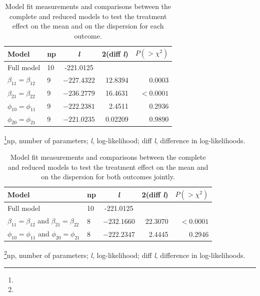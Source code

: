 \documentclass[useAMS,referee]{biom}
\begin{document}

\begin{table}[htb]
\centering
\caption{Model fit measurements and comparisons between the complete and reduced models to test the treatment effect on the mean and on the dispersion for each outcome.}
\begin{tabular}{p{6cm}p{1cm}crr} \hline
Model & np & \textit{l} & 2(diff \textit{l}) & $P(> \chi^2)$ \\ 		\hline
Full model & 10 & -221.0125 && \\
\hdashline
\qquad	$\beta_{11} = \beta_{12}$   & 9 &$-227.4322$ & 12.8394& 0.0003\\
\qquad	$\beta_{21} = \beta_{22}$   & 9 &$-236.2779$ & 16.4631& $<0.0001$\\

\qquad $\phi_{10} = \phi_{11}$  & 9 & $-222.2381$ & 2.4511& 0.2936\\

\qquad  $\phi_{20} = \phi_{21}$  & 9 &$-221.0235$ & 0.02209& 0.9890\\


\hline
\end{tabular}

\footnote{}{np, number of parameters; \textit{l}, log-likelihood; diff \textit{l}, difference in log-likelihoods.}	

\label{table2}
\end{table}


\begin{table}[htb]
\centering
\caption{Model fit measurements and comparisons between the complete and reduced models to test the treatment effect on the mean and on the dispersion for both outcomes jointly.}
\begin{tabular}{p{6cm}p{1cm}crr} \hline
Model & np & \textit{l} & 2(diff \textit{l}) & $P(> \chi^2)$ \\ 		\hline
Full model & 10 & -221.0125 && \\
\hdashline
\qquad	$\beta_{11} = \beta_{12}$ and $\beta_{21} = \beta_{22}$   & 8 &$-232.1660$ & 22.3070& $<0.0001$\\

\qquad $\phi_{10} = \phi_{11}$ and $\phi_{20} = \phi_{21}$   & 8 & $-222.2347$ & 2.4445& 0.2946\\


\hline
\end{tabular}

\footnote{}{np, number of parameters; \textit{l}, log-likelihood; diff \textit{l}, difference in log-likelihoods.}	

\label{table5.3}
\end{table}
\end{document}
